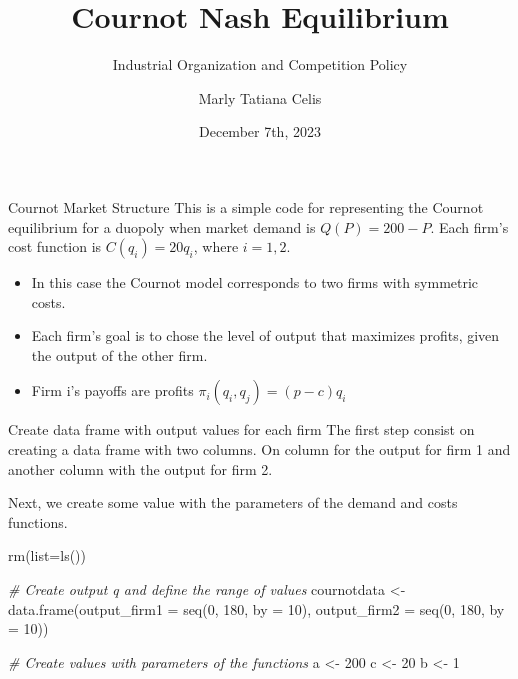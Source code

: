 \documentclass[
  ignorenonframetext,
]{beamer}
\title{Cournot Nash Equilibrium}
\subtitle{Industrial Organization and Competition Policy}
\author{Marly Tatiana Celis}
\date{December 7th, 2023}
\newenvironment{Shaded}{\begin{snugshade}}{\end{snugshade}}
\newcommand{\AttributeTok}[1]{\textcolor[rgb]{0.77,0.63,0.00}{#1}}
\newcommand{\CommentTok}[1]{\textcolor[rgb]{0.56,0.35,0.01}{\textit{#1}}}
\newcommand{\DecValTok}[1]{\textcolor[rgb]{0.00,0.00,0.81}{#1}}
\newcommand{\FunctionTok}[1]{\textcolor[rgb]{0.00,0.00,0.00}{#1}}
\newcommand{\NormalTok}[1]{#1}
\newcommand{\OtherTok}[1]{\textcolor[rgb]{0.56,0.35,0.01}{#1}}
\begin{document}
\frame{\titlepage}

\begin{frame}{Cournot Market Structure}
\protect\hypertarget{cournot-market-structure}{}
This is a simple code for representing the Cournot equilibrium for a
duopoly when market demand is \(Q(P)=200-P\). Each firm's cost function
is \(C(q_i )=20q_i\), where \(i=1,2\).

\begin{itemize}
\item
  In this case the Cournot model corresponds to two firms with symmetric
  costs.
\item
  Each firm's goal is to chose the level of output that maximizes
  profits, given the output of the other firm.
\item
  Firm i's payoffs are profits \(\pi_i(q_i,q_j)=(p-c)q_i\)
\end{itemize}
\end{frame}

\begin{frame}[fragile]{Create data frame with output values for each
firm}
\protect\hypertarget{create-data-frame-with-output-values-for-each-firm}{}
The first step consist on creating a data frame with two columns. On
column for the output for firm 1 and another column with the output for
firm 2.

Next, we create some value with the parameters of the demand and costs
functions.

\begin{Shaded}
\begin{Highlighting}[]
\FunctionTok{rm}\NormalTok{(}\AttributeTok{list=}\FunctionTok{ls}\NormalTok{())}

\CommentTok{\# Create output q and define the range of values}
\NormalTok{cournotdata }\OtherTok{\textless{}{-}} \FunctionTok{data.frame}\NormalTok{(}\AttributeTok{output\_firm1 =} \FunctionTok{seq}\NormalTok{(}\DecValTok{0}\NormalTok{, }\DecValTok{180}\NormalTok{, }\AttributeTok{by =} \DecValTok{10}\NormalTok{),}
                 \AttributeTok{output\_firm2 =} \FunctionTok{seq}\NormalTok{(}\DecValTok{0}\NormalTok{, }\DecValTok{180}\NormalTok{, }\AttributeTok{by =} \DecValTok{10}\NormalTok{))}

\CommentTok{\# Create values with parameters of the functions }
\NormalTok{a }\OtherTok{\textless{}{-}} \DecValTok{200}
\NormalTok{c }\OtherTok{\textless{}{-}} \DecValTok{20}
\NormalTok{b }\OtherTok{\textless{}{-}} \DecValTok{1}
\end{Highlighting}
\end{Shaded}
\end{frame}
\end{document}

